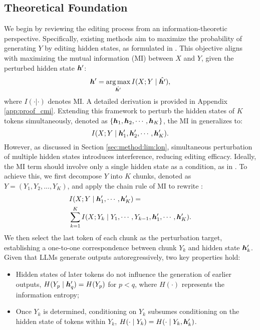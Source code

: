 \subsection{Theoretical Foundation} \label{sec:any_the}
We begin by reviewing the editing process from an information-theoretic perspective.
Specifically, existing methods aim to maximize the probability of generating $Y$ by editing hidden states, as formulated in . This objective aligns with maximizing the mutual information (MI) \cite{information} between $X$ and $Y$, given the perturbed hidden state ${\bm{h}}'$:
\begin{equation}
    {\bm{h}}' = \operatorname*{arg\,max}_{\hat{{\bm{h}}'}} I(X; Y \mid \hat{{\bm{h}}'}), \label{eq:MI_single}
\end{equation}
where $I(\cdot|\cdot)$ denotes MI. A detailed derivation is provided in Appendix \ref{app:proof_cmi}. Extending this framework to perturb the hidden states of $K$ tokens simultaneously, denoted as $\{{\bm{h}}_1, {\bm{h}}_2, \cdots, {\bm{h}}_K\}$, the MI in  generalizes to:
\begin{equation}
    I(X; Y \mid {\bm{h}}'_1, {\bm{h}}'_2, \cdots, {\bm{h}}'_K) \label{eq:MI_more}.
\end{equation}
However, as discussed in Section \ref{sec:method:lim:lon}, simultaneous perturbation of multiple hidden states introduces interference, reducing editing efficacy. Ideally, the MI term should involve only a single hidden state as a condition, as in . %
To achieve this, we first decompose $Y$ into $K$ chunks, denoted as $Y = (Y_1, Y_2, ..., Y_K)$, and apply the chain rule of MI to rewrite :
\begin{equation}
    \begin{aligned}
        &I(X; Y \mid {\bm{h}}'_1, \cdots, {\bm{h}}'_K)=\\ &\sum_{k=1}^K I(X; Y_k \mid Y_1, \cdots, Y_{k-1}, {\bm{h}}'_1, \cdots, {\bm{h}}'_K). \label{eq:decom}
    \end{aligned}
\end{equation}
We then select the last token of each chunk as the perturbation target, establishing a one-to-one correspondence between chunk $Y_k$ and hidden state ${\bm{h}}'_k$. Given that LLMs generate outputs autoregressively, two key properties hold:
\begin{itemize}[leftmargin=*]
    \item Hidden states of later tokens do not influence the generation of earlier outputs, \ie $H(Y_p \mid {\bm{h}}'_q) = H(Y_p)$ for $p < q$, where $H(\cdot)$ represents the information entropy;
    \item Once $Y_k$ is determined, conditioning on $Y_k$ subsumes conditioning on the hidden state of tokens within $Y_k$, \ie $H(\cdot \mid Y_k) = H(\cdot \mid Y_k, {\bm{h}}'_k)$.
\end{itemize}
